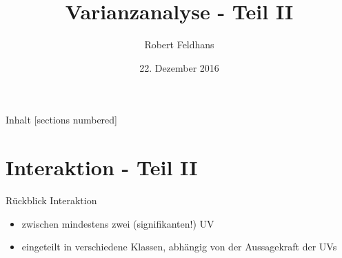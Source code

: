 \documentclass{beamer}
\title{Varianzanalyse - Teil II}
\date{22. Dezember 2016}
\author{Robert Feldhans}
\institute{Experimentelle Psychologie für Nichtpsychologen}
\begin{document}
	\maketitle
	
	\begin{frame}{Inhalt}
		[sections numbered]
		\tableofcontents[hideallsubsections]
	\end{frame}
	
	\section{Interaktion - Teil II}
	
	\begin{frame}{Rückblick}
		Interaktion
		\begin{itemize}
			\item zwischen mindestens zwei (signifikanten!) UV
			\item eingeteilt in verschiedene Klassen, abhängig von der Aussagekraft der UVs
		\end{itemize}
	\end{frame}	
	
\end{document}
